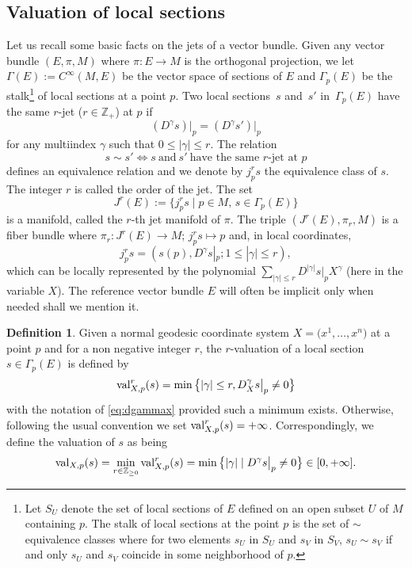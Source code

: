 \documentclass[pdftex]{sigma}
\numberwithin{equation}{section}
\theoremstyle{definition}
\newtheorem{defn}[thm]{Definition}
\newcommand{\Z}{\mathbb Z}
\begin{document}
\subsection{Valuation of local sections}
Let us recall some basic facts on the jets of a vector bundle. Given any vector bundle $(E,\pi, M)$ where $\pi\colon E\to M$ is the orthogonal projection, we let $\Gamma(E):=C^\infty(M,E)$ be the vector space of sections of $E$ and $\Gamma_p(E)$ be the stalk\footnote{Let $S_U$ denote the set of local sections of $E$ defined on an open subset $U$ of $M$ containing $p$. The stalk of local sections at the point $p$ is the set of $\sim$ equivalence classes where for two elements $s_U$ in $S_U$ and $s_V$ in $S_V$, $s_U\sim s_V$ if and only $s_U$ and $s_V$ coincide in some neighborhood of $p$.} of local sections at a point $p$. Two local sections~$s$ and~$s'$ in~$\Gamma_p(E)$ have the same $r$-jet ($r\in \mathbb{Z}_+$) at $p$ if
\[(D^{\gamma}s) \vert _p=(D^{\gamma}s') \vert _p\]
for any multiindex $\gamma$ such that $0\leq |\gamma|\leq r$. The relation
\[s\sim s'\iff s\ \text{and}\ s'\ \text{have the same $r$-jet at $p$}\]
defines an equivalence relation and we denote by $j_p^rs$ the equivalence class of $s$. The integer $r$ is called the order of the jet. The set
\[J^r(E):=\big\{j_p^rs\mid p\in M,\, s\in \Gamma_p(E)\big\}\]
is a manifold, called the $r$-th jet manifold of $\pi$. The triple $(J^r(E),\pi_r,M)$ is a fiber bundle where $\pi_r\colon J^r(E)\to M$; $j_p^rs\mapsto p$ and, in local coordinates,
\[j_p^rs=(s(p),D^{\gamma}s|_p; 1\leq |\gamma|\leq r),\]
which can be locally represented by the polynomial $\sum_{|\gamma|\leq r} D^{|\gamma|} s|_p X^\gamma$ (here in the variable $X$).
The reference vector bundle $E$ will often be implicit only when needed shall we mention it.
\begin{defn} Given a normal geodesic coordinate system $X=\bigl(x^1,\dots,x^n\bigr)$ at a point $p$ and for a non negative integer $r$, the $r$-valuation of a local section $s\in\Gamma_p(E)$ is defined by
\[{\rm val}^r_{X,p}(s)=\min \big\{ \vert\gamma\vert\leq r, D_X^{\gamma}s \big \vert _p\neq 0\big\}\]
with the notation of \eqref{eq:dgammax} provided such a minimum exists. Otherwise, following the usual convention we set ${\rm val}^r_{X,p}(s)=+\infty$.
Correspondingly, we define the valuation of $s$ as being
\begin{equation}\label{eq:valp}
{\rm val}_{X,p}(s)=\min _{r\in \Z_{\geq 0}} {\rm val}^r_{X, p}(s)=\min \big\{\vert\gamma\vert\mid D^{\gamma}s \big \vert _p\neq 0\big\} \in [0,+\infty].
\end{equation}
\end{defn}
\end{document}
